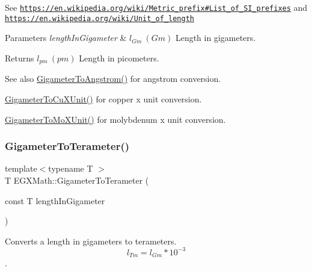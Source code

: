 See \href{https://en.wikipedia.org/wiki/Metric_prefix#List_of_SI_prefixes}{\tt https\+://en.\+wikipedia.\+org/wiki/\+Metric\+\_\+prefix\#\+List\+\_\+of\+\_\+\+S\+I\+\_\+prefixes} and \href{https://en.wikipedia.org/wiki/Unit_of_length}{\tt https\+://en.\+wikipedia.\+org/wiki/\+Unit\+\_\+of\+\_\+length} 
\begin{DoxyParams}{Parameters}
{\em length\+In\+Gigameter} & $ l_{Gm}\ (Gm)$ Length in gigameters. \\
\hline
\end{DoxyParams}
\begin{DoxyReturn}{Returns}
$ l_{pm}\ (pm)$ Length in picometers. 
\end{DoxyReturn}
\begin{DoxySeeAlso}{See also}
\mbox{\hyperlink{group___e_g_x_math-_conversions-_length_conversions-_s_i-_gigameter-_non-_s_i_ga622e85e3f663039f3802b29d25655989}{Gigameter\+To\+Angstrom()}} for angstrom conversion. 

\mbox{\hyperlink{group___e_g_x_math-_conversions-_length_conversions-_s_i-_gigameter-_non-_s_i_gab542297b31676ef5b3cf62f0c63a6f20}{Gigameter\+To\+Cu\+X\+Unit()}} for copper x unit conversion. 

\mbox{\hyperlink{group___e_g_x_math-_conversions-_length_conversions-_s_i-_gigameter-_non-_s_i_gac30ae06633de77b05d859ffb3cd2a577}{Gigameter\+To\+Mo\+X\+Unit()}} for molybdenum x unit conversion. 
\end{DoxySeeAlso}
\mbox{\label{group___e_g_x_math-_conversions-_length_conversions-_s_i-_gigameter-_s_i_ga7cab1971a673d663a4eadd070afedf7e}} 
\subsubsection{\texorpdfstring{Gigameter\+To\+Terameter()}{GigameterToTerameter()}}
{\footnotesize\ttfamily template$<$typename T $>$ \\
T E\+G\+X\+Math\+::\+Gigameter\+To\+Terameter (\begin{DoxyParamCaption}\item[{const T}]{length\+In\+Gigameter }\end{DoxyParamCaption})}



Converts a length in gigameters to terameters. \[ l_{Tm}=l_{Gm} * 10^{-3} \]. 

